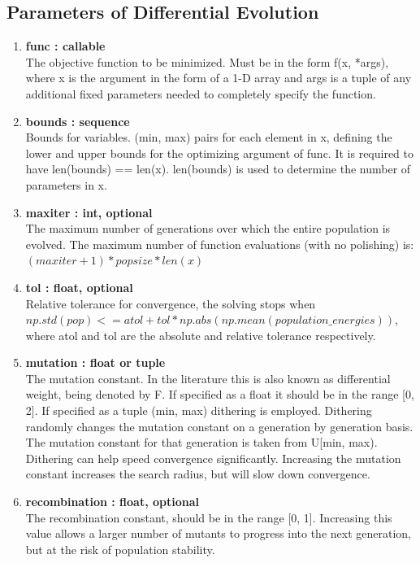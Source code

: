 \subsection{Parameters of Differential Evolution}
\begin{enumerate}
\item \textbf{func : callable}\\
The objective function to be minimized. Must be in the form f(x, *args), where x is the argument in the form of a 1-D array and args is a tuple of any additional fixed parameters needed to completely specify the function.
\item \textbf{bounds : sequence}\\
Bounds for variables. (min, max) pairs for each element in x, defining the lower and upper bounds for the optimizing argument of func. It is required to have len(bounds) == len(x). len(bounds) is used to determine the number of parameters in x.
\item \textbf{maxiter : int, optional}\\
The maximum number of generations over which the entire population is evolved. The maximum number of function evaluations (with no polishing) is:\\ \((maxiter + 1) * popsize * len(x)\)

\item \textbf{tol : float, optional}\\
Relative tolerance for convergence, the solving stops when\\ \(np.std(pop) <= atol + tol * np.abs(np.mean(population\_energies))\), where atol and tol are the absolute and relative tolerance respectively.

\item \textbf{mutation : float or tuple}\\
The mutation constant. In the literature this is also known as differential weight, being denoted by F. If specified as a float it should be in the range [0, 2]. If specified as a tuple (min, max) dithering is employed. Dithering randomly changes the mutation constant on a generation by generation basis. The mutation constant for that generation is taken from U[min, max). Dithering can help speed convergence significantly. Increasing the mutation constant increases the search radius, but will slow down convergence.

\item \textbf{recombination : float, optional}\\
The recombination constant, should be in the range [0, 1]. Increasing this value allows a larger number of mutants to progress into the next generation, but at the risk of population stability.
\end{enumerate}

